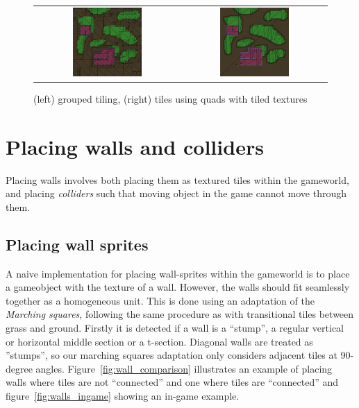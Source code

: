 \begin{figure}[H]
    \centering
    \begin{tabular}{cc}
        \includegraphics[width=0.5\textwidth]{figures/generating_levels/grouped-tile.png}
        &
        \includegraphics[width=0.5\textwidth]{figures/generating_levels/quad-tile.png}
    \end{tabular}
    \caption{(left) grouped tiling, (right) tiles using quads with tiled
    textures}\label{fig:quad_tiling_comparison}
\end{figure}

\section{Placing walls and colliders}
Placing walls involves both placing them as textured tiles within the gameworld, and placing \textit{colliders} such that moving object in the game cannot move through them.

\subsection{Placing wall sprites}
A naive implementation for placing wall-sprites within the gameworld is to place a gameobject with the texture of a wall.
However, the walls should fit seamlessly together as a homogeneous unit.
This is done using an adaptation of the \textit{Marching squares}, following the same procedure as with transitional tiles between grass and ground.
Firstly it is detected if a wall is a ``stump'', a regular vertical or horizontal middle section or a t-section. 
Diagonal walls are treated as ''stumps'', so our marching squares adaptation only considers adjacent tiles at 90-degree angles.
Figure~\ref{fig:wall_comparison} illustrates an example of placing walls where tiles are not ``connected'' and one where tiles are ``connected'' and figure~\ref{fig:walls_ingame} showing an in-game example.

